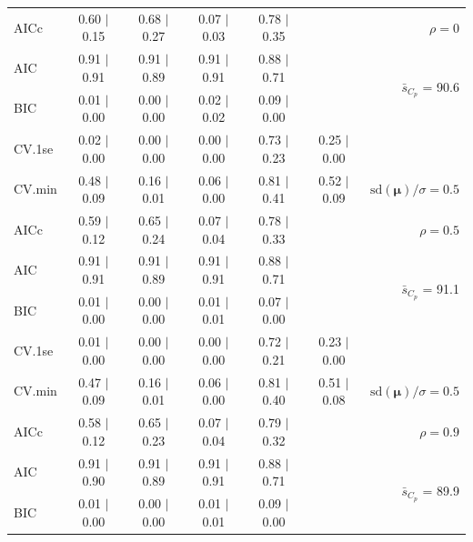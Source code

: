 \documentclass[12pt]{article}
\newcommand{\mr}[1]{\mathrm{#1}}
\newcommand{\bm}[1]{\mathbf{#1}}
\begin{document}
\begin{table}[p]
\begin{center}
\begin{tabular}{l*{5}{c}|r}
AICc & 0.60 $\mid$ 0.15 & 0.68 $\mid$ 0.27 & 0.07 $\mid$ 0.03 & 0.78 $\mid$ 0.35 & & $\rho=0$ \\
AIC & 0.91 $\mid$ 0.91 & 0.91 $\mid$ 0.89 & 0.91 $\mid$ 0.91 & 0.88 $\mid$ 0.71 & & \multirow{2}{*}{$\bar{s}_{C_p}$ = 90.6} \\
BIC & 0.01 $\mid$ 0.00 & 0.00 $\mid$ 0.00 & 0.02 $\mid$ 0.02 & 0.09 $\mid$ 0.00 & & \\
 \hline 
CV.1se & 0.02 $\mid$ 0.00 & 0.00 $\mid$ 0.00 & 0.00 $\mid$ 0.00 & 0.73 $\mid$ 0.23 & 0.25 $\mid$ 0.00 &\\
CV.min & 0.48 $\mid$ 0.09 & 0.16 $\mid$ 0.01 & 0.06 $\mid$ 0.00 & 0.81 $\mid$ 0.41 & 0.52 $\mid$ 0.09 &  $\mr{sd}(\bm{\mu})/\sigma=0.5$ \\
AICc & 0.59 $\mid$ 0.12 & 0.65 $\mid$ 0.24 & 0.07 $\mid$ 0.04 & 0.78 $\mid$ 0.33 & & $\rho=0.5$ \\
AIC & 0.91 $\mid$ 0.91 & 0.91 $\mid$ 0.89 & 0.91 $\mid$ 0.91 & 0.88 $\mid$ 0.71 & & \multirow{2}{*}{$\bar{s}_{C_p}$ = 91.1} \\
BIC & 0.01 $\mid$ 0.00 & 0.00 $\mid$ 0.00 & 0.01 $\mid$ 0.01 & 0.07 $\mid$ 0.00 & & \\
 \hline 
CV.1se & 0.01 $\mid$ 0.00 & 0.00 $\mid$ 0.00 & 0.00 $\mid$ 0.00 & 0.72 $\mid$ 0.21 & 0.23 $\mid$ 0.00 &\\
CV.min & 0.47 $\mid$ 0.09 & 0.16 $\mid$ 0.01 & 0.06 $\mid$ 0.00 & 0.81 $\mid$ 0.40 & 0.51 $\mid$ 0.08 &  $\mr{sd}(\bm{\mu})/\sigma=0.5$ \\
AICc & 0.58 $\mid$ 0.12 & 0.65 $\mid$ 0.23 & 0.07 $\mid$ 0.04 & 0.79 $\mid$ 0.32 & & $\rho=0.9$ \\
AIC & 0.91 $\mid$ 0.90 & 0.91 $\mid$ 0.89 & 0.91 $\mid$ 0.91 & 0.88 $\mid$ 0.71 & & \multirow{2}{*}{$\bar{s}_{C_p}$ = 89.9} \\
BIC & 0.01 $\mid$ 0.00 & 0.00 $\mid$ 0.00 & 0.01 $\mid$ 0.01 & 0.09 $\mid$ 0.00 & & \\
 \hline 
 \end{tabular}
\end{center}
\vspace{-1cm}
\end{table}
\end{document}
